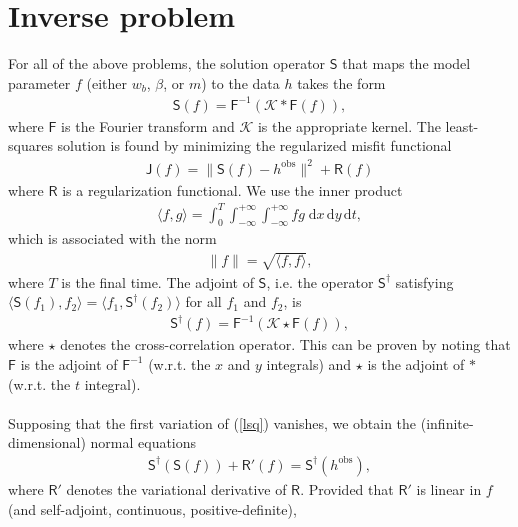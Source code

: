 \documentclass[paper=a4, fontsize=11pt]{article}
\begin{document}
\section*{Inverse problem}
For all of the above problems, the solution operator $\mathsf{S}$ that maps the model
parameter $f$ (either $w_b$, $\beta$, or $m$) to the data $h$ takes the form
\begin{align}
\mathsf{S}(f) = \mathsf{F}^{-1} \left( \mathcal{K}* \mathsf{F}(f)\right),
\end{align}
where $\mathsf{F}$ is the Fourier transform and $\mathcal{K}$ is the appropriate kernel.
The least-squares solution is found by minimizing the regularized misfit functional
\begin{align}
\mathsf{J}(f) = \| \mathsf{S}(f) - h^{\mathrm{obs}} \|^2 + \mathsf{R}(f) \label{lsq}
\end{align}
where $\mathsf{R}$ is a regularization functional.
We use the inner product
\begin{align}
\langle f,g\rangle = \int_0^T \int_{-\infty}^{+\infty} \int_{-\infty}^{+\infty} fg \;\mathrm{d}x\,\mathrm{d}y\,\mathrm{d}t,
\end{align}
which is associated with the norm
\begin{align}
\| f \| = \sqrt{\langle f,f\rangle},
\end{align}
where $T$ is the final time.
The adjoint of $\mathsf{S}$, i.e. the operator $\mathsf{S}^\dagger$  satisfying
$\langle \mathsf{S}(f_1),f_2 \rangle = \langle f_1, \mathsf{S}^\dagger(f_2)
\rangle$ for all $f_1$ and $f_2$, is
\begin{align}
\mathsf{S}^\dagger (f) = \mathsf{F}^{-1} \left( \mathcal{K} \star \mathsf{F}(f)\right),
\end{align}
where $\star$ denotes the cross-correlation operator.
This can be proven by noting that $\mathsf{F}$ is the adjoint of $\mathsf{F}^{-1}$ (w.r.t. the $x$ and $y$ integrals)
and $\star$ is the adjoint of $*$ (w.r.t. the $t$ integral).\\ \\
Supposing that the first variation of (\ref{lsq}) vanishes, we obtain the
(infinite-dimensional) normal equations
\begin{align}
\mathsf{S}^\dagger (\mathsf{S}(f)) + \mathsf{R}'(f) = \mathsf{S}^\dagger (h^{\mathrm{obs}}), \label{normal}
\end{align}
where $\mathsf{R}'$ denotes the variational derivative of $\mathsf{R}$.
Provided that $\mathsf{R}'$ is linear in $f$ (and self-adjoint, continuous, positive-definite),
\end{document}

